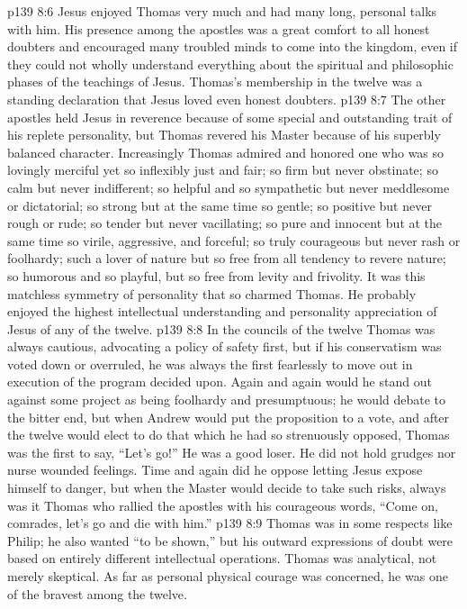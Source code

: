 \vs p139 8:6 Jesus enjoyed Thomas very much and had many long, personal talks with him. His presence among the apostles was a great comfort to all honest doubters and encouraged many troubled minds to come into the kingdom, even if they could not wholly understand everything about the spiritual and philosophic phases of the teachings of Jesus. Thomas’s membership in the twelve was a standing declaration that Jesus loved even honest doubters.
\pc \vs p139 8:7 The other apostles held Jesus in reverence because of some special and outstanding trait of his replete personality, but Thomas revered his Master because of his superbly balanced character. Increasingly Thomas admired and honored one who was so lovingly merciful yet so inflexibly just and fair; so firm but never obstinate; so calm but never indifferent; so helpful and so sympathetic but never meddlesome or dictatorial; so strong but at the same time so gentle; so positive but never rough or rude; so tender but never vacillating; so pure and innocent but at the same time so virile, aggressive, and forceful; so truly courageous but never rash or foolhardy; such a lover of nature but so free from all tendency to revere nature; so humorous and so playful, but so free from levity and frivolity. It was this matchless symmetry of personality that so charmed Thomas. He probably enjoyed the highest intellectual understanding and personality appreciation of Jesus of any of the twelve.
\pc \vs p139 8:8 In the councils of the twelve Thomas was always cautious, advocating a policy of safety first, but if his conservatism was voted down or overruled, he was always the first fearlessly to move out in execution of the program decided upon. Again and again would he stand out against some project as being foolhardy and presumptuous; he would debate to the bitter end, but when Andrew would put the proposition to a vote, and after the twelve would elect to do that which he had so strenuously opposed, Thomas was the first to say, “Let’s go!” He was a good loser. He did not hold grudges nor nurse wounded feelings. Time and again did he oppose letting Jesus expose himself to danger, but when the Master would decide to take such risks, always was it Thomas who rallied the apostles with his courageous words, “Come on, comrades, let’s go and die with him.”
\vs p139 8:9 Thomas was in some respects like Philip; he also wanted “to be shown,” but his outward expressions of doubt were based on entirely different intellectual operations. Thomas was analytical, not merely skeptical. As far as personal physical courage was concerned, he was one of the bravest among the twelve.
